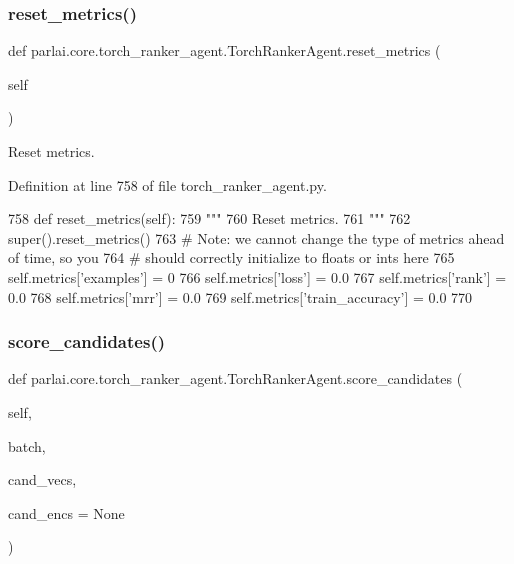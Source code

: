 \subsubsection{\texorpdfstring{reset\+\_\+metrics()}{reset\_metrics()}}
{\footnotesize\ttfamily def parlai.\+core.\+torch\+\_\+ranker\+\_\+agent.\+Torch\+Ranker\+Agent.\+reset\+\_\+metrics (\begin{DoxyParamCaption}\item[{}]{self }\end{DoxyParamCaption})}

\begin{DoxyVerb}Reset metrics.
\end{DoxyVerb}
 

Definition at line 758 of file torch\+\_\+ranker\+\_\+agent.\+py.


\begin{DoxyCode}
758     \textcolor{keyword}{def }reset\_metrics(self):
759         \textcolor{stringliteral}{"""}
760 \textcolor{stringliteral}{        Reset metrics.}
761 \textcolor{stringliteral}{        """}
762         super().reset\_metrics()
763         \textcolor{comment}{# Note: we cannot change the type of metrics ahead of time, so you}
764         \textcolor{comment}{# should correctly initialize to floats or ints here}
765         self.metrics[\textcolor{stringliteral}{'examples'}] = 0
766         self.metrics[\textcolor{stringliteral}{'loss'}] = 0.0
767         self.metrics[\textcolor{stringliteral}{'rank'}] = 0.0
768         self.metrics[\textcolor{stringliteral}{'mrr'}] = 0.0
769         self.metrics[\textcolor{stringliteral}{'train\_accuracy'}] = 0.0
770 
\end{DoxyCode}
\mbox{\label{classparlai_1_1core_1_1torch__ranker__agent_1_1TorchRankerAgent_a65d5726a4e2098212298bc2cdf13e70f}} 
\subsubsection{\texorpdfstring{score\+\_\+candidates()}{score\_candidates()}}
{\footnotesize\ttfamily def parlai.\+core.\+torch\+\_\+ranker\+\_\+agent.\+Torch\+Ranker\+Agent.\+score\+\_\+candidates (\begin{DoxyParamCaption}\item[{}]{self,  }\item[{}]{batch,  }\item[{}]{cand\+\_\+vecs,  }\item[{}]{cand\+\_\+encs = {\ttfamily None} }\end{DoxyParamCaption})}

